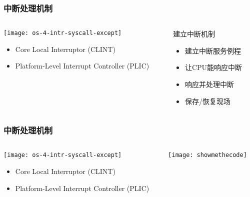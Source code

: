 \begin{frame}[plain,t]
	\frametitle{中断处理机制}
	\begin{columns}
		
		\begin{column}{0.45\textwidth}
			\centering
			\texttt{[image: os-4-intr-syscall-except]}
			\begin{itemize} \small
				\item Core Local	Interruptor (CLINT)
				\item Platform-Level Interrupt Controller (PLIC)
			\end{itemize}
			
		\end{column}
		
		\begin{column}{0.5\textwidth}
			
			\centering
			\LARGE 建立中断机制 \pause
			
			\Large
			\begin{itemize}
				\item 建立中断服务例程	 \pause
				\item 让CPU能响应中断 \pause
				\item 响应并处理中断 \pause
				\item 保存/恢复现场 
			\end{itemize}		
			
		\end{column}
		
	\end{columns}
	
\end{frame}

\begin{frame}[plain,t]
	\frametitle{中断处理机制}
	\begin{columns}
		
		\begin{column}{0.4\textwidth}
			\centering
			\texttt{[image: os-4-intr-syscall-except]}
			\begin{itemize} \small
				\item Core Local	Interruptor (CLINT)
				\item Platform-Level Interrupt Controller (PLIC)
			\end{itemize}
			
		\end{column}
		
		\begin{column}{0.6\textwidth}
			
			\centering
			
			\texttt{[image: showmethecode]}
		
		\end{column}
		
	\end{columns}
	
\end{frame}



